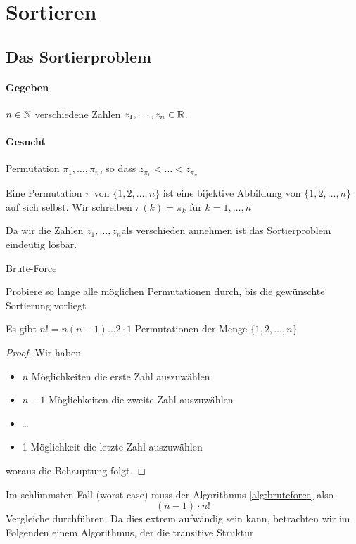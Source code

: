 \section{Sortieren}
\subsection{Das Sortierproblem}
\paragraph{Gegeben} $n \in \mathbb{N}$ verschiedene Zahlen $z_1,\ldots,z_n \in \mathbb{R}$.
\paragraph{Gesucht} Permutation $\pi_1,\ldots,\pi_n$, so dass $z_{\pi_1} < \ldots < z_{\pi_n}$
\begin{definition}[Permutation]
Eine Permutation $\pi$ von $\{1,2,\ldots, n\}$ ist eine bijektive Abbildung von $\{1,2,\ldots,n\} $ auf sich selbst. Wir schreiben $\pi(k)=\pi_k$ für $k=1,\ldots,n$
\end{definition}
\begin{remark}
Da wir die Zahlen $z_1,\ldots,z_n$als verschieden annehmen ist das Sortierproblem eindeutig lösbar.
\end{remark}
\begin{algorithm}
\label{alg:bruteforce}
\caption{Brute-Force}
Probiere so lange alle möglichen Permutationen durch, bis die gewünschte Sortierung vorliegt
\end{algorithm}
\begin{theorem}
Es gibt $n! = n(n-1)\ldots 2 \cdot 1$ Permutationen der Menge $\{1,2,\ldots,n\} $
\end{theorem}
\begin{proof}
Wir haben 
\begin{itemize}
	\item $n$ Möglichkeiten die erste Zahl auszuwählen
	\item $n-1$ Möglichkeiten die zweite Zahl auszuwählen
	\item \ldots
	\item 1 Möglichkeit die letzte Zahl auszuwählen
\end{itemize}
woraus die Behauptung folgt.
\end{proof}
Im schlimmsten Fall (worst case) muss der Algorithmus \ref{alg:bruteforce} also
\[
	(n-1)\cdot n!
\]
Vergleiche durchführen. Da dies extrem aufwändig sein kann, betrachten wir im Folgenden einem Algorithmus, der die transitive Struktur
